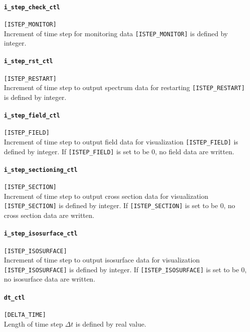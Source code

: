 \paragraph{\tt i\_step\_check\_ctl}
\label{href_t:i_step_check_ctl}
\verb|[ISTEP_MONITOR]| \\
Increment of time step for monitoring data \verb|[ISTEP_MONITOR]| is defined by integer.

\paragraph{\tt i\_step\_rst\_ctl}
\label{href_t:i_step_rst_ctl}
\verb|[ISTEP_RESTART]| \\
Increment of time step to output spectrum data for restarting \verb|[ISTEP_RESTART]| is defined by integer.

\paragraph{\tt i\_step\_field\_ctl}
\label{href_t:i_step_field_ctl}
\verb|[ISTEP_FIELD]| \\
Increment of time step to output field data for visualization \verb|[ISTEP_FIELD]| is defined by integer. If \verb|[ISTEP_FIELD]| is set to be 0, no field data are written.

\paragraph{\tt i\_step\_sectioning\_ctl}
\label{href_t:i_step_sectioning_ctl}
\verb|[ISTEP_SECTION]| \\
Increment of time step to output cross section data for visualization \verb|[ISTEP_SECTION]| is defined by integer. If \verb|[ISTEP_SECTION]| is set to be 0, no cross section data are written.

\paragraph{\tt i\_step\_isosurface\_ctl}
\label{href_t:i_step_isosurface_ctl}
\verb|[ISTEP_ISOSURFACE]| \\
Increment of time step to output isosurface data for visualization \verb|[ISTEP_ISOSURFACE]| is defined by integer. If \verb|[ISTEP_ISOSURFACE]| is set to be 0, no isosurface data are written.

\paragraph{\tt dt\_ctl}
\label{href_t:dt_ctl}
\verb|[DELTA_TIME]| \\
Length of time step $\Delta t$ is defined by real value.

